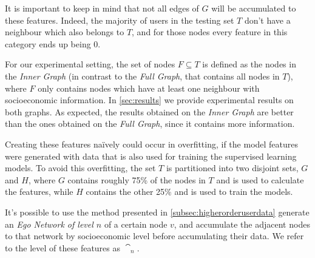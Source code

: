 It is important to keep in mind that not all edges of $G$ will be accumulated to these features. Indeed, the majority of users in the testing set $T$ don't have a neighbour which also belongs to $T$, and for those nodes every feature in this category ends up being $0$.

For our experimental setting, the set of nodes $F \subseteq T$ is defined as the nodes in the \emph{Inner Graph} (in contrast to the \emph{Full Graph}, that contains all nodes in $T$), where $F$ only contains nodes which have at least one neighbour with socioeconomic information. In \cref{sec:results} we provide experimental results on both graphs. As expected, the results obtained on the \emph{Inner Graph} are better than the ones obtained on the \emph{Full Graph}, since it contains more information.

Creating these features naïvely could occur in overfitting, if the model features were generated with data that is also used for training the supervised learning models. To avoid this overfitting, the set $T$ is partitioned into two disjoint sets, $G$ and $H$, where $G$ contains roughly 75\% of the nodes in $T$ and is used to calculate the features, while $H$ contains the other 25\% and is used to train the models.

It's possible to use the method presented in \cref{subsec:higherorderuserdata} generate an \emph{Ego Network of level $n$} of a certain node $v$, and accumulate the adjacent nodes to that network by socioeconomic level before accumulating their data. We refer to the level of these features as $\cat_n$.
